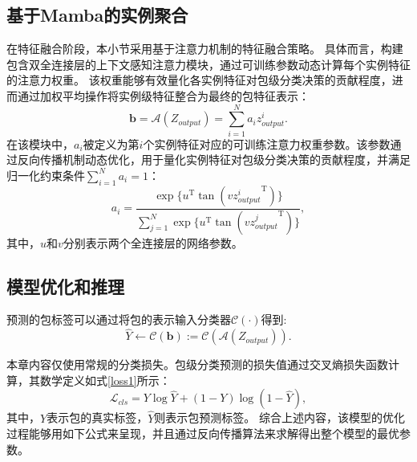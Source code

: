 \subsection[\hspace{-2pt}基于Mamba的实例聚合]{{\heiti{} \hspace{-8pt}基于Mamba的实例聚合}}\label{section3: 基于Mamba的实例聚合}

在特征融合阶段，本小节采用基于注意力机制的特征融合策略。
具体而言，构建包含双全连接层的上下文感知注意力模块，通过可训练参数动态计算每个实例特征的注意力权重。
该权重能够有效量化各实例特征对包级分类决策的贡献程度，进而通过加权平均操作将实例级特征整合为最终的包特征表示：
\begin{equation}
  \mathbf{b}=\mathcal{A}(Z_{output})=\sum_{i=1}^{N}a_iz^i_{output}.
\end{equation}
在该模块中，$a_i$被定义为第$i$个实例特征对应的可训练注意力权重参数。该参数通过反向传播机制动态优化，用于量化实例特征对包级分类决策的贡献程度，并满足归一化约束条件$\sum_{i=1}^{N}a_i = 1$：
\begin{equation}
  a_{i}=\frac{\exp\{u^{\mathrm{T}}\tan(v{z^i_{output}}^{\mathrm{T}})\}}{\sum_{j=1}^{N} \exp\{u^{\mathrm{T}}\tan(v{z^j_{output}}^{\mathrm{T}})\}}, 
\end{equation}
其中，$u$和$v$分别表示两个全连接层的网络参数。

\subsection[\hspace{-2pt}模型优化和推理]{{\heiti{} \hspace{-8pt}模型优化和推理}}\label{section3: 模型优化和推理}

预测的包标签可以通过将包的表示输入分类器$\mathcal{C}\left(\cdot\right)$得到:
\begin{equation}
  \hat{Y}\gets\mathcal{C}\left(\mathbf{b}\right):= \mathcal{C}(\mathcal{A}(Z_{output})).
\end{equation}

本章内容仅使用常规的分类损失。包级分类预测的损失值通过交叉熵损失函数计算，其数学定义如式\ref{loss1}所示：
\begin{equation}
  \mathcal{L}_{cls}=Y \log\hat{Y}+(1-Y)\log(1-\hat{Y}),
  \label{loss1}
\end{equation}
其中，$Y$表示包的真实标签，$\hat{Y}$则表示包预测标签。
综合上述内容，该模型的优化过程能够用如下公式来呈现，并且通过反向传播算法来求解得出整个模型的最优参数。

